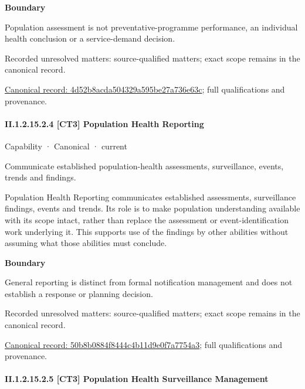 \textbf{Boundary}



Population assessment is not preventative-programme performance, an individual health conclusion or a service-demand decision.


{\small Recorded unresolved matters: source-qualified matters; exact scope remains in the canonical record.}\par
{\footnotesize \href{../../../../continuum/strategy/capability/4d52b8acda504329a595be27a736e63c.md}{Canonical record: 4d52b8acda504329a595be27a736e63c}; full qualifications and provenance.}\par
\paragraph*{II.1.2.15.2.4 [CT3] Population Health Reporting}
\label{navigation:II.1.2.15.2.4}

\label{element:50b8b0884f8444c4b11d9e0f7a7754a3}
{\small Capability · Canonical · current}\par

Communicate established population-health assessments, surveillance, events, trends and findings.



Population Health Reporting communicates established assessments, surveillance findings, events and trends. Its role is to make population understanding available with its scope intact, rather than replace the assessment or event-identification work underlying it. This supports use of the findings by other abilities without assuming what those abilities must conclude.



\textbf{Boundary}



General reporting is distinct from formal notification management and does not establish a response or planning decision.


{\small Recorded unresolved matters: source-qualified matters; exact scope remains in the canonical record.}\par
{\footnotesize \href{../../../../continuum/strategy/capability/50b8b0884f8444c4b11d9e0f7a7754a3.md}{Canonical record: 50b8b0884f8444c4b11d9e0f7a7754a3}; full qualifications and provenance.}\par
\paragraph*{II.1.2.15.2.5 [CT3] Population Health Surveillance Management}
\label{navigation:II.1.2.15.2.5}

